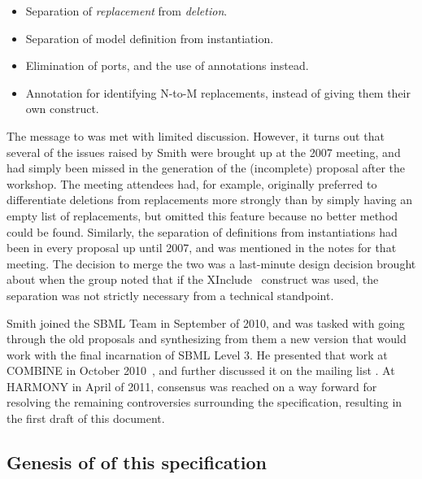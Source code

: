 \begin{itemize}\setlength{\parskip}{0ex}

\item Separation of \emph{replacement} from \emph{deletion}.

\item Separation of model definition from instantiation.

\item Elimination of ports, and the use of annotations instead.

\item Annotation for identifying N-to-M replacements, instead of giving them their own construct.

\end{itemize}

The message to  was met with limited discussion.  However, it turns out that several of the issues raised by Smith were brought up at the 2007 meeting, and had simply been missed in the generation of the (incomplete) proposal after the workshop.  The meeting attendees had, for example, originally preferred to differentiate deletions from replacements more strongly than by simply having an empty list of replacements, but omitted this feature because no better method could be found.  Similarly, the separation of definitions from instantiations had been in every proposal up until 2007, and was mentioned in the notes for that meeting.  The decision to merge the two was a last-minute design decision brought about when the group noted that if the XInclude~\citep{xinclude} construct was used, the separation was not strictly necessary from a technical standpoint.

Smith joined the SBML Team in September of 2010, and was tasked with going through the old proposals and synthesizing from them a new version that would work with the final incarnation of SBML Level 3.  He presented that work at COMBINE in October 2010~\citep{smith:2010c}, and further discussed it on the mailing list .  At HARMONY in April of 2011, consensus was reached on a way forward for resolving the remaining controversies surrounding the specification, resulting in the first draft of this document.

\subsection{Genesis of  of this specification}

